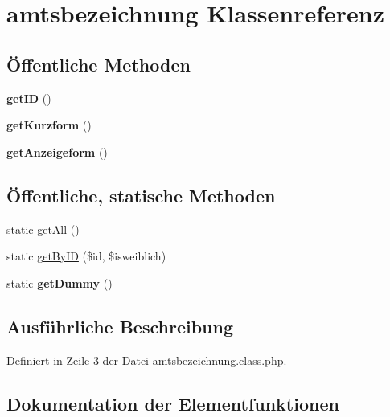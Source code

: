 \hypertarget{classamtsbezeichnung}{}\section{amtsbezeichnung Klassenreferenz}
\label{classamtsbezeichnung}
\subsection*{Öffentliche Methoden}
\begin{DoxyCompactItemize}
\item 
\mbox{\label{classamtsbezeichnung_a19c89fc4eb1ce5d0e1406ea10bf5fbb8}} 
{\bfseries get\+ID} ()
\item 
\mbox{\label{classamtsbezeichnung_a57100f1e4227ad6d0943d40e520e2f44}} 
{\bfseries get\+Kurzform} ()
\item 
\mbox{\label{classamtsbezeichnung_a01a015c4b1cc3d361d8f218b3255739f}} 
{\bfseries get\+Anzeigeform} ()
\end{DoxyCompactItemize}
\subsection*{Öffentliche, statische Methoden}
\begin{DoxyCompactItemize}
\item 
static \mbox{\hyperlink{classamtsbezeichnung_a17fae61e79e378f359119a51b9e26f49}{get\+All}} ()
\item 
static \mbox{\hyperlink{classamtsbezeichnung_a742c93108e548b9b445eb9bde017ec45}{get\+By\+ID}} (\$id, \$isweiblich)
\item 
\mbox{\label{classamtsbezeichnung_ab3a7bedf0f8ea24c2acddd75d5794de5}} 
static {\bfseries get\+Dummy} ()
\end{DoxyCompactItemize}


\subsection{Ausführliche Beschreibung}


Definiert in Zeile 3 der Datei amtsbezeichnung.\+class.\+php.



\subsection{Dokumentation der Elementfunktionen}
\mbox{\label{classamtsbezeichnung_a17fae61e79e378f359119a51b9e26f49}} 

